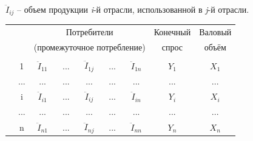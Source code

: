 \documentclass[12pt, 4paper]{book}
\begin{document}
{$\ddot{I}_{ij}$ – объем продукции \textit{i}-й отрасли, использованной в \textit{j}-й отрасли.
\begin{table}[h]
	\centering
	\begin{tabular}[center]{|p{0.2in}|p{0.2in}|p{0.6in}|p{0.6in}|p{0.6in}|p{0.6in}|p{0.6in}|p{0.7in}|p{0.7in}|}
		\hline
		\multicolumn{2}{|c|}{\multirow{2}{*}{}} & \multicolumn{5}{c|}{Потребители} &\multicolumn{1}{c|}{Конечный}  & \multicolumn{1}{c|}{Валовый}  \\
		\multicolumn{2}{|c|}{\multirow{2}{*}{}} & \multicolumn{5}{c|}{(промежуточное потребление)} & \multicolumn{1}{c|}{спрос} & \multicolumn{1}{c|}{объём} \\ \hhline{~~-----~~} 
		\multicolumn{2}{|c|}{\multirow{2}{*}{}} & \centering {1} & \centering {...} & \centering {j} & \centering {...}  & \centering {n} & & \\ \hline
		\multicolumn{1}{|c|}{} & \multicolumn{1}{c|}{1}  & \multicolumn{1}{c|}{$\ddot{I}_{11}$} & \multicolumn{1}{c|}{...} & \multicolumn{1}{c|}{$\ddot{I}_{1j}$} & \multicolumn{1}{c|}{...} & \multicolumn{1}{c|}{$\ddot{I}_{1n}$}& \multicolumn{1}{c|}{$Y_1$} & \multicolumn{1}{c|}{$X_1$}\\  \hhline{~--------} 
		\multicolumn{1}{|c|}{} & \multicolumn{1}{c|}{...}  & \multicolumn{1}{c|}{...} & \multicolumn{1}{c|}{...} & \multicolumn{1}{c|}{...} & \multicolumn{1}{c|}{...} & \multicolumn{1}{c|}{...}& \multicolumn{1}{c|}{...} & \multicolumn{1}{c|}{...}\\  \hhline{~--------}
		\multicolumn{1}{|c|}{} & \multicolumn{1}{c|}{i}  & \multicolumn{1}{c|}{$\ddot{I}_{i1}$} & \multicolumn{1}{c|}{...} & \multicolumn{1}{c|}{$\ddot{I}_{ij}$} & \multicolumn{1}{c|}{...} & \multicolumn{1}{c|}{$\ddot{I}_{in}$}& \multicolumn{1}{c|}{$Y_i$} & \multicolumn{1}{c|}{$X_i$}\\  \hhline{~--------} 
		\multicolumn{1}{|c|}{} & \multicolumn{1}{c|}{...}  & \multicolumn{1}{c|}{...} & \multicolumn{1}{c|}{...} & \multicolumn{1}{c|}{...} & \multicolumn{1}{c|}{...} & \multicolumn{1}{c|}{...}& \multicolumn{1}{c|}{...} & \multicolumn{1}{c|}{...}\\  \hhline{~--------} 
		\multicolumn{1}{|c|}{} & \multicolumn{1}{c|}{n}  & \multicolumn{1}{c|}{$\ddot{I}_{n1}$} & \multicolumn{1}{c|}{...} & \multicolumn{1}{c|}{$\ddot{I}_{nj}$} & \multicolumn{1}{c|}{...} & \multicolumn{1}{c|}{$\ddot{I}_{nn}$}& \multicolumn{1}{c|}{$Y_n$} & \multicolumn{1}{c|}{$X_n$}\\ \hline
	\end{tabular}
\end{table}
\par

}
\end{document}
